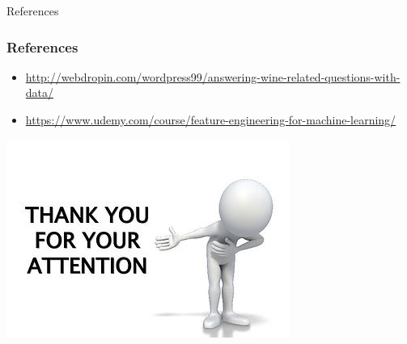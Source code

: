 \documentclass[11pt]{beamer}
\begin{document}
		\begin{frame}{References}
			\frametitle{References}
			\begin{itemize}
				\item \url{http://webdropin.com/wordpress99/answering-wine-related-questions-with-data/}
				\item \url{https://www.udemy.com/course/feature-engineering-for-machine-learning/}
			\end{itemize}
		
		\end{frame}
	
	\begin{frame}{}
	
			\begin{flushleft}
				\includegraphics[width=0.6\linewidth, height=0.80\textheight]{thanks}
			\end{flushleft}
	
	\end{frame}
		

\end{document}
